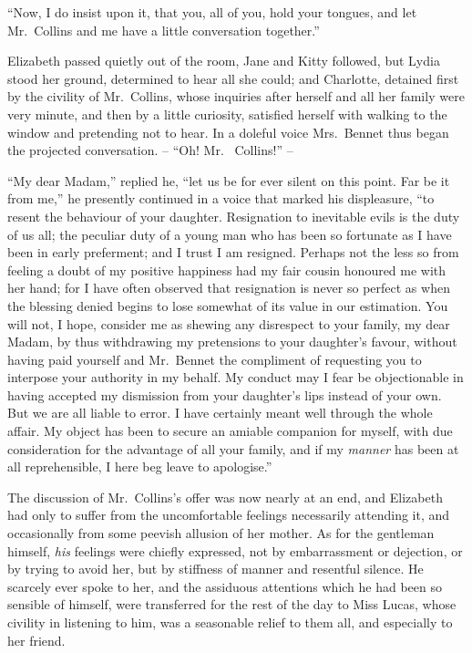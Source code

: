 “Now, I do insist upon it, that you, all of you, hold
your tongues, and let Mr.\ Collins and me have a little
conversation together.”

Elizabeth passed quietly out of the room, Jane and
Kitty followed, but Lydia stood her ground, determined
to hear all she could; and Charlotte, detained first by
the civility of Mr.\ Collins, whose inquiries after herself
and all her family were very minute, and then by a little
curiosity, satisfied herself with walking to the window and
pretending not to hear. In a doleful voice Mrs.\ Bennet
thus began the projected conversation. -- “Oh! Mr.\ %
Collins!” --

“My dear Madam,” replied he, “let us be for ever
silent on this point. Far be it from me,” he presently
continued in a voice that marked his displeasure, “to
resent the behaviour of your daughter. Resignation to
inevitable evils is the duty of us all; the peculiar duty
of a young man who has been so fortunate as I have been
in early preferment; and I trust I am resigned. Perhaps
not the less so from feeling a doubt of my positive happiness
had my fair cousin honoured me with her hand;
for I have often observed that resignation is never so
perfect as when the blessing denied begins to lose somewhat
of its value in our estimation. You will not, I hope,
consider me as shewing any disrespect to your family,
my dear Madam, by thus withdrawing my pretensions to
your daughter’s favour, without having paid yourself and
Mr.\ Bennet the compliment of requesting you to interpose
your authority in my behalf. My conduct may
I fear be objectionable in having accepted my dismission
from your daughter’s lips instead of your own. But we
are all liable to error. I have certainly meant well through
the whole affair. My object has been to secure an amiable
companion for myself, with due consideration for the
advantage of all your family, and if my \textit{manner} has been
at all reprehensible, I here beg leave to apologise.”


The discussion of Mr.\ Collins’s offer was now nearly at
an end, and Elizabeth had only to suffer from the uncomfortable
feelings necessarily attending it, and occasionally
from some peevish allusion of her mother. As for the
gentleman himself, \textit{his} feelings were chiefly expressed, not
by embarrassment or dejection, or by trying to avoid her,
but by stiffness of manner and resentful silence. He
scarcely ever spoke to her, and the assiduous attentions
which he had been so sensible of himself, were transferred
for the rest of the day to Miss Lucas, whose civility in
listening to him, was a seasonable relief to them all, and
especially to her friend.

